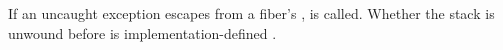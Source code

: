 \label{exceptions}

If an uncaught exception escapes from a fiber's \entryfn,
 is called.
Whether the stack is unwound before  is
implementation-defined .
